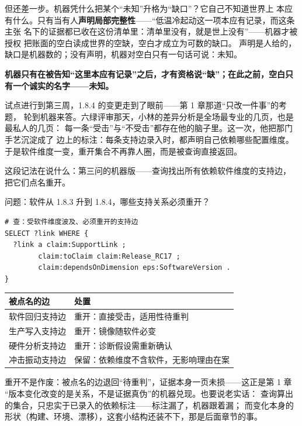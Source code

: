 但还差一步。机器凭什么把某个“未知”升格为“缺口”？它自己不知道世界上
本应有什么。只有当有人\textbf{声明局部完整性}——“低温冷起动这一项本应有记录，而这条主张
名下的证据都已收在这份清单里：清单里没有，就是世上没有”——机器才被授权
把账面的空白读成世界的空缺，空白才成立为可数的缺口。
声明是人给的，缺口是机器数的；没有声明，机器对空白只有一句话可说：未知。

\textbf{机器只有在被告知“这里本应有记录”之后，才有资格说“缺”；在此之前，空白只有一个诚实的名字——未知。}

试点进行到第三周，1.8.4 的变更走到了眼前——第 1 章那道“只改一件事”的考题，
轮到机器来答。六绿评审那天，小林的差异分析是全场最专业的几页，也是最私人的几页：
每一条“受击”与“不受击”都存在他的脑子里。这一次，他把那门手艺沉淀成了
边上的标注：每条支持边录入时，都声明自己依赖哪些配置维度。
于是软件维度一变，重开集合不再靠人圈，而是被查询直接返回。

这段记法在说什么：第三问的机器版——查询找出所有依赖软件维度的支持边，
把它们点名重开。

问题：软件从 1.8.3 升到 1.8.4，哪些支持关系必须重开？

\nopagebreak[4]
\begin{codebox}
\begin{Verbatim}[fontsize=\small,breaklines=true,breakanywhere=true,breaksymbolleft={},breaksymbolright={}]
# 查：受软件维度波及、必须重开的支持边
SELECT ?link WHERE {
  ?link a claim:SupportLink ;
        claim:toClaim claim:Release_RC17 ;
        claim:dependsOnDimension eps:SoftwareVersion .
}
\end{Verbatim}
\end{codebox}

\begin{center}
\begingroup\small
\setlength{\tabcolsep}{4pt}
\begin{tabularx}{\linewidth}{@{}XX@{}}
\toprule
被点名的边 & 处置 \\
\midrule
软件回归支持边 & 重开：直接受击，适用性待重判 \\
生产写入支持边 & 重开：镜像随软件必变 \\
硬件分析支持边 & 重开：诊断假设需重新确认 \\
冲击振动支持边 & 保留：依赖维度不含软件，无影响理由在案 \\
\bottomrule
\end{tabularx}
\endgroup
\end{center}

重开不是作废：被点名的边退回“待重判”，证据本身一页未损——这正是第 1 章
“版本变化改变的是关系，不是证据真伪”的机器兑现。也要说老实话：
查询算出的集合，只忠实于已录入的依赖标注——标注漏了，机器跟着漏；
而变化本身的形状（构建、环境、漂移），这套小结构还装不下，那是后面章节的事。

